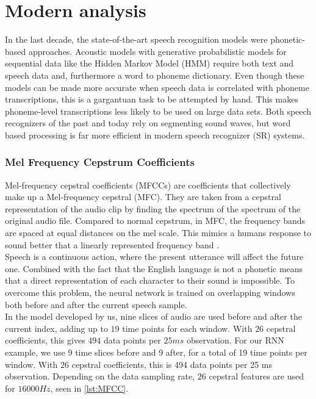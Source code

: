 \section{Modern analysis}
In the last decade, the state-of-the-art speech recognition models were phonetic-based
 approaches. Acoustic models with generative probabilistic models for sequential 
data like the Hidden Markov Model (HMM) require both text and speech data and,
furthermore a word to phoneme dictionary.
 Even though these models can be made more accurate when speech data is correlated with phoneme transcriptions, this is a gargantuan task to be attempted by hand. This makes 
 phoneme-level transcriptions less likely to be used on large data sets.
  Both  speech recognizers of the past and today  rely on segmenting sound waves, but word based processing is far more efficient in modern speech recognizer (SR) systems.
  
\subsubsection{Mel Frequency Cepstrum Coefficients}

Mel-frequency cepstral coefficients (MFCCs) are coefficients that collectively make up a Mel-frequency cepstral (MFC). 
They are taken from a cepstral representation of the audio clip by finding the spectrum of the spectrum of the original audio file.
 Compared to normal cepstrum, in MFC, the frequency bands are spaced at equal distances on the mel scale.
 This mimics a humans response to sound better that a linearly represented frequency band \cite{sahidullah2012design}.\\

Speech is a continuous action, where the present utterance will affect the future one. Combined with the fact that the English language is not a phonetic means that a direct
representation of each character to their sound is impossible. To overcome this problem, the neural network is trained on overlapping windows both before and after the current speech sample.\\

In the model developed by us, nine slices of audio are used before and after the current index, adding up to $19$ time points for each window. With $26$ cepstral coefficients, this gives $494$ data points per $25ms$ observation.
For our RNN example, we use 9 time slices before and 9 after, for a total of 19 time points per window. With 26 cepstral coefficients, this is 494 data points per 25 ms observation. Depending on the data sampling rate, $26$ cepstral features are used for $16 000 Hz$, seen in \ref{lst:MFCC}.

